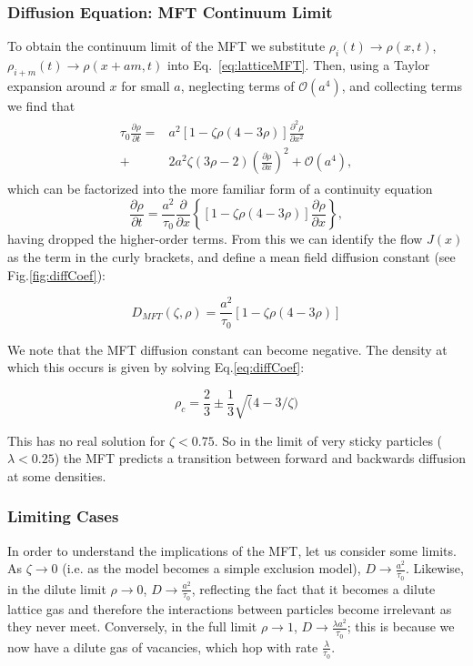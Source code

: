\documentclass[
reprint, amsmath,amssymb,
]{revtex4-1}
\newcommand{\partDeriv}[2]{\frac{\partial #1}{\partial #2}}
\begin{document}
\subsubsection{Diffusion Equation: MFT Continuum Limit}
 To obtain the continuum limit of the MFT we substitute $\rho_i(t)
 \rightarrow \rho(x, t)$, $\rho_{i+m}(t) \rightarrow \rho(x + am, t)$
 into Eq.~\ref{eq:latticeMFT}.  Then, using a Taylor expansion around $x$ for
 small $a$, neglecting terms of $\mathcal{O}(a^4)$, and collecting
 terms we find that
\begin{align}
 \begin{split}
  \tau_0 \partDeriv{\rho}{t} =& a^2 \left[ 1-\zeta \rho (4-3\rho)  \right] \partDeriv{^2 \rho}{x^2} 
\\
  +& 2 a^2 \zeta (3\rho-2) \left(\partDeriv{\rho}{x}\right)^2 + \mathcal{O}(a^4) ,
 \end{split}
\end{align}
which can be factorized into the more familiar form of a continuity equation
\begin{equation}
\label{eq:contPDE}
 \partDeriv{\rho}{t} = \frac{a^2}{\tau_0} \partDeriv{}{x} \left\{ \left[1 - \zeta \rho\left(4-3\rho\right) \right] \partDeriv{\rho}{x} \right\},
\end{equation}
having dropped the higher-order terms.  From this we can identify the
flow $J(x)$ as the term in the curly brackets, and define a mean field
diffusion constant (see Fig.\ref{fig:diffCoef}):

\begin{equation} D_{MFT}(\zeta,\rho) =  \frac{a^2}{\tau_0} \left[ 1 - \zeta \rho\left(4-3\rho\right) \right ] \label{eq:diffCoef} \end{equation}

We note that the MFT diffusion constant can become negative. 
The density at
which this occurs is given by solving Eq.\ref{eq:diffCoef}:

\[\rho_c=\frac{2}{3} \pm \frac{1}{3} \sqrt(4-3/\zeta)\]

This has no real solution for $\zeta<0.75$.  So in the limit
of very sticky particles ($\lambda<0.25$) the MFT predicts a
transition between forward and backwards diffusion at some densities.  


\subsubsection{Limiting Cases}

In order to understand the implications of the MFT, let us consider
some limits. As $\zeta \rightarrow 0$ (i.e. as the model becomes a
simple exclusion model), $D \rightarrow \frac{a^2}{\tau_0}$. Likewise,
in the dilute limit $\rho \rightarrow 0$, $D \rightarrow \frac{
  a^2}{\tau_0}$, reflecting the fact that it becomes a dilute lattice
gas and therefore the interactions between particles become irrelevant
as they never meet.  Conversely, in the full limit $\rho \rightarrow
1$, $D \rightarrow \frac{\lambda a^2}{\tau_0}$; this is because we now
have a dilute gas of vacancies, which hop with rate
$\frac{\lambda}{\tau_0}$.  
\end{document}

